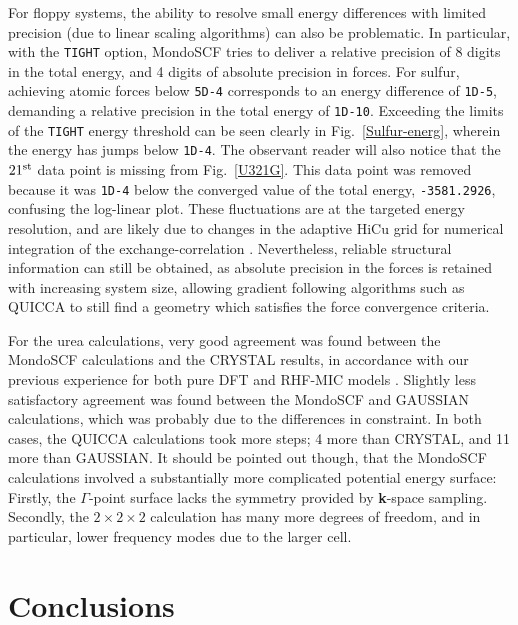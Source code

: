 \twolinestyle{\documentclass[prb,preprint]{revtex4}}
\begin{document}
For floppy systems, the ability to resolve small energy differences with 
limited precision (due to linear scaling algorithms) can also be problematic.
In particular, with the {\tt TIGHT} option, {\sc MondoSCF} tries to deliver a 
relative precision of 8 digits in the total energy, and 4 digits of absolute 
precision in forces.  For sulfur, achieving atomic forces below {\tt 5D-4} 
corresponds to an energy difference of {\tt 1D-5}, demanding a relative 
precision in the total energy of {\tt 1D-10}.  Exceeding the limits of the
{\tt TIGHT} energy threshold can be seen clearly in Fig.~\ref{Sulfur-energ},
wherein the energy has jumps below {\tt 1D-4}.  The observant reader will also
notice that the $21^{\rm st}$ data point is missing from Fig.~\ref{U321G}.  This 
data point was removed because it was {\tt 1D-4} below the converged value of the 
total energy, {\tt   -3581.2926}, confusing the log-linear plot. These 
fluctuations are at the targeted energy resolution, and are likely due to 
changes in the adaptive HiCu grid for numerical integration of the 
exchange-correlation \cite{CTymczak05a}.  
Nevertheless, reliable structural information can still be obtained, as absolute 
precision in the forces is retained with increasing system size, allowing gradient following
algorithms such as QUICCA to still find a geometry which satisfies the force convergence
criteria. 

For the urea calculations, very good agreement was found between the 
{\sc MondoSCF} calculations and the {\sc CRYSTAL} results, in accordance 
with our previous experience for both pure DFT \cite{CTymczak05a} and RHF-MIC models \cite{CTymczak05b}.  
Slightly less satisfactory agreement was found between the {\sc MondoSCF} and 
{\sc GAUSSIAN} calculations, which was probably due to the differences in 
constraint.  In both cases, the QUICCA calculations took more steps; 
4 more than {\sc CRYSTAL}, and 11 more than {\sc GAUSSIAN}.  It should
be pointed out though, that the {\sc MondoSCF} calculations involved 
a substantially more complicated potential energy surface:  Firstly, 
the $\Gamma$-point surface lacks the symmetry provided by {\bf k}-space
sampling.  Secondly, the $2\times2\times2$ calculation has many more 
degrees of freedom, and in particular, lower frequency modes due to the 
larger cell.  
  
\section{Conclusions} \label{conclusion}
\end{document}
